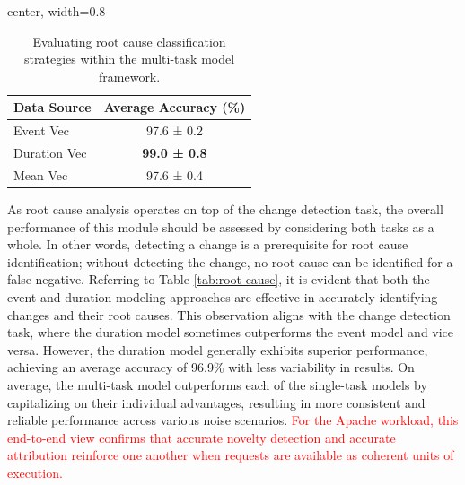 \documentclass[preprint,12pt]{elsarticle}
\begin{document}
\begin{table}[tb]
\centering
\caption{Evaluating root cause classification strategies within the multi-task model framework.}
\label{tab:root-cause-alone}
\begin{adjustbox}{center, width=0.8\textwidth}
\begin{tabular}{|l|c|}
\hline
Data Source & Average Accuracy (\%) \\ \hline
Event Vec   & 97.6 ± 0.2            \\
Duration Vec & \textbf{99.0 ± 0.8}  \\
Mean Vec    & 97.6 ± 0.4            \\ \hline
\end{tabular}
\end{adjustbox}
\end{table}

As root cause analysis operates on top of the change detection task, the overall performance of this module should be assessed by considering both tasks as a whole. In other words, detecting a change is a prerequisite for root cause identification; without detecting the change, no root cause can be identified for a false negative. Referring to Table \ref{tab:root-cause}, it is evident that both the event and duration modeling approaches are effective in accurately identifying changes and their root causes. This observation aligns with the change detection task, where the duration model sometimes outperforms the event model and vice versa. However, the duration model generally exhibits superior performance, achieving an average accuracy of 96.9\% with less variability in results. On average, the multi-task model outperforms each of the single-task models by capitalizing on their individual advantages, resulting in more consistent and reliable performance across various noise scenarios. \textcolor{red}{For the Apache workload, this end-to-end view confirms that accurate novelty detection and accurate attribution reinforce one another when requests are available as coherent units of execution.}
\end{document}
